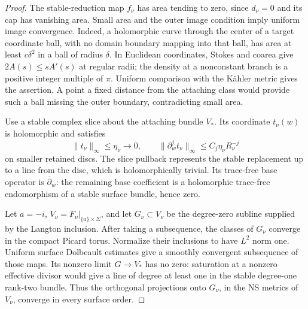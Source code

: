 \documentclass[11pt]{amsart}
\theoremstyle{definition}
\theoremstyle{remark}
\theoremstyle{plain}
\begin{document}
\begin{proof}
The stable-reduction map $f_\nu$ has area tending to zero, since
$d_\nu=0$ and its cap has vanishing area. Small area and the outer
image condition imply uniform image convergence. Indeed, a holomorphic
curve through the center of a target coordinate ball, with no domain
boundary mapping into that ball, has area at least $c\delta^2$ in
a ball of radius $\delta$. In Euclidean coordinates, Stokes and
coarea give $2A(s)\leq sA'(s)$ at regular radii; the density at a
nonconstant branch is a positive integer multiple of $\pi$.
Uniform comparison with the Kähler metric gives the assertion.
A point a fixed distance from the attaching class would provide
such a ball missing the outer boundary, contradicting small area.

Use a stable complex slice about the attaching bundle $V_*$.
Its coordinate $t_\nu(w)$ is holomorphic and satisfies
\begin{equation}\label{eq:converse-slow-parameter}
 \|t_\nu\|_\infty\leq\eta_\nu\to0,\qquad
 \|\partial_w^jt_\nu\|_\infty\leq C_j\eta_\nu R_\nu^{-j}
\end{equation}
on smaller retained discs. The slice pullback represents the stable
replacement up to a line from the disc, which is holomorphically
trivial. Its trace-free base operator is $\bar\partial_w$:
the remaining base coefficient is a holomorphic trace-free
endomorphism of a stable surface bundle, hence zero.

Let $a=-i$, $V_\nu=F_\nu|_{\{a\}\times\Sigma}$, and let
$G_\nu\subset V_\nu$ be the degree-zero subline supplied by the
Langton inclusion. After taking a subsequence, the classes of $G_\nu$
converge in the compact Picard torus. Normalize their inclusions
to have $L^2$ norm one. Uniform surface Dolbeault estimates give a
smoothly convergent subsequence of those maps. Its nonzero limit
$G\to V_*$ has no zero: saturation at a nonzero effective divisor
would give a line of degree at least one in the stable degree-one
rank-two bundle. Thus the orthogonal projections onto $G_\nu$,
in the NS metrics of $V_\nu$, converge in every surface order.


\end{proof}
\end{document}
